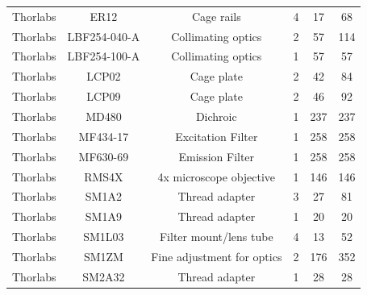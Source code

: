 \documentclass{article}
\begin{document}
\begin{table}[!h]
\begin{tabular}{cccccc}
Thorlabs        & ER12                 & Cage rails                              & 4            & 17                        & 68                      \\
Thorlabs        & LBF254-040-A         & Collimating optics                      & 2            & 57                        & 114                     \\
Thorlabs        & LBF254-100-A         & Collimating optics                      & 1            & 57                        & 57                      \\
Thorlabs        & LCP02                & Cage plate                              & 2            & 42                        & 84                      \\
Thorlabs        & LCP09                & Cage plate                              & 2            & 46                        & 92                      \\
Thorlabs        & MD480                & Dichroic                                & 1            & 237                       & 237                     \\
Thorlabs        & MF434-17             & Excitation Filter                       & 1            & 258                       & 258                     \\
Thorlabs        & MF630-69             & Emission Filter                         & 1            & 258                       & 258                     \\
Thorlabs        & RMS4X                & 4x microscope objective                 & 1            & 146                       & 146                     \\
Thorlabs        & SM1A2                & Thread adapter                          & 3            & 27                        & 81                      \\
Thorlabs        & SM1A9                & Thread adapter                          & 1            & 20                        & 20                      \\
Thorlabs        & SM1L03               & Filter mount/lens tube                  & 4            & 13                        & 52                      \\
Thorlabs        & SM1ZM                & Fine adjustment for optics              & 2            & 176                       & 352                     \\
Thorlabs        & SM2A32               & Thread adapter                          & 1            & 28                        & 28                      \\

\end{tabular}
\end{table}
\end{document}
